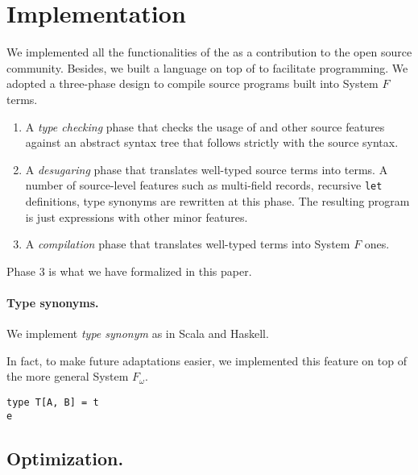 \section{Implementation}

We implemented all the functionalities of the \name as a contribution to the
open source community. Besides, we built a language on top of \name to
facilitate programming. We adopted a three-phase design to compile source
programs built into System $ F $ terms.

\begin{enumerate}
\item A \emph{type checking} phase that checks the usage of \name and other
  source features against an abstract syntax tree that follows strictly with the
  source syntax.

\item A \emph{desugaring} phase that translates well-typed source terms into
  \name terms. A number of source-level features such as multi-field records,
  recursive \texttt{let} definitions, type synonyms are rewritten at this phase.
  The resulting program is just \name expressions with other minor features.

\item A \emph{compilation} phase that translates well-typed \name terms
  into System $ F $ ones.
\end{enumerate}

Phase 3 is what we have formalized in this paper.

\paragraph{Type synonyms.}

We implement \emph{type synonym} as in Scala and Haskell.

In fact, to make future adaptations easier, we implemented this feature on top
of the more general System $ F_{\omega} $.


\begin{lstlisting}
type T[A, B] = t
e
\end{lstlisting}

\subsection{Optimization.}

